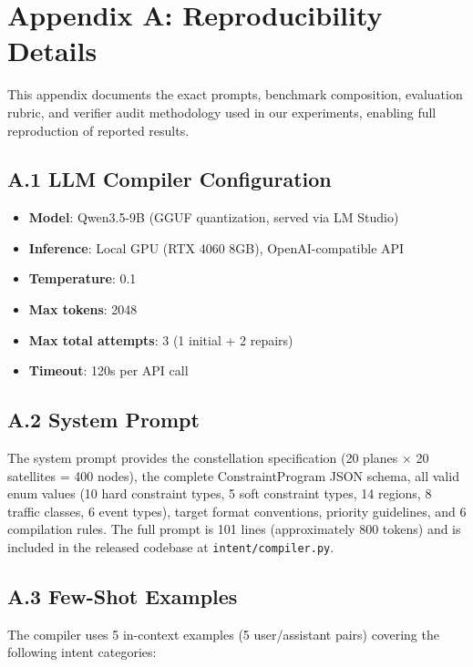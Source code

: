 
\section*{Appendix A: Reproducibility Details}
\label{sec:appendix_reproducibility}

This appendix documents the exact prompts, benchmark composition,
evaluation rubric, and verifier audit methodology used in our experiments,
enabling full reproduction of reported results.

\subsection*{A.1 LLM Compiler Configuration}

\begin{itemize}
\item \textbf{Model}: Qwen3.5-9B (GGUF quantization, served via LM Studio)
\item \textbf{Inference}: Local GPU (RTX 4060 8GB), OpenAI-compatible API
\item \textbf{Temperature}: 0.1
\item \textbf{Max tokens}: 2048
\item \textbf{Max total attempts}: 3 (1 initial + 2 repairs)
\item \textbf{Timeout}: 120s per API call
\end{itemize}

\subsection*{A.2 System Prompt}

The system prompt provides the constellation specification (20 planes
$\times$ 20 satellites = 400 nodes), the complete ConstraintProgram JSON
schema, all valid enum values (10 hard constraint types, 5 soft constraint
types, 14 regions, 8 traffic classes, 6 event types), target format
conventions, priority guidelines, and 6 compilation rules. The full
prompt is 101 lines (approximately 800 tokens) and is included in the
released codebase at \texttt{intent/compiler.py}.

\subsection*{A.3 Few-Shot Examples}

The compiler uses 5 in-context examples (5 user/assistant pairs)
covering the following intent categories:

